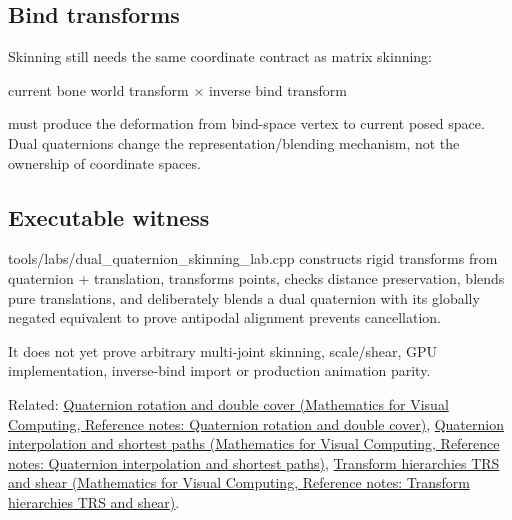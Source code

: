 \subsection{Bind transforms}\label{appendix-921f3f2efb53-bind-transforms}

\hypertarget{appendix-921f3f2efb53-bind-transforms}{}

Skinning still needs the same coordinate contract as matrix skinning:

current bone world transform × inverse bind transform

must produce the deformation from bind-space vertex to current posed space. Dual quaternions change the representation/blending mechanism, not the ownership of coordinate spaces.

\subsection{Executable witness}\label{appendix-921f3f2efb53-executable-witness}

\hypertarget{appendix-921f3f2efb53-executable-witness}{}

tools/labs/dual\_quaternion\_skinning\_lab.cpp constructs rigid transforms from quaternion + translation, transforms points, checks distance preservation, blends pure translations, and deliberately blends a dual quaternion with its globally negated equivalent to prove antipodal alignment prevents cancellation.

It does not yet prove arbitrary multi-joint skinning, scale/shear, GPU implementation, inverse-bind import or production animation parity.

Related: \href{../02-Mathematics-for-Visual-Computing/main.pdf\#nameddest=appendix-8e61ab68f6b2}{Quaternion rotation and double cover (Mathematics for Visual Computing, Reference notes: Quaternion rotation and double cover)}, \href{../02-Mathematics-for-Visual-Computing/main.pdf\#nameddest=appendix-9b4b8254f26b}{Quaternion interpolation and shortest paths (Mathematics for Visual Computing, Reference notes: Quaternion interpolation and shortest paths)}, \href{../02-Mathematics-for-Visual-Computing/main.pdf\#nameddest=appendix-292c061cd47c}{Transform hierarchies TRS and shear (Mathematics for Visual Computing, Reference notes: Transform hierarchies TRS and shear)}.
